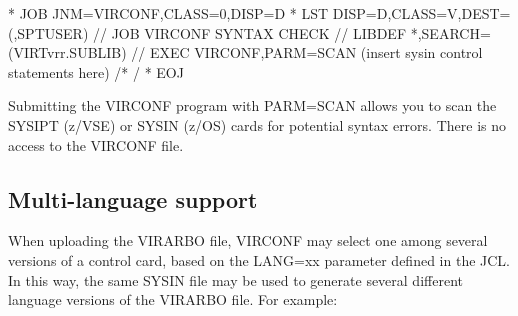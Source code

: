 \documentclass[letterpaper,10pt,english]{sphinxmanual}
\begin{document}
\begin{sphinxVerbatim}[commandchars=\\\{\}]
* \PYGZdl{}\PYGZdl{} JOB JNM=VIRCONF,CLASS=0,DISP=D
* \PYGZdl{}\PYGZdl{} LST DISP=D,CLASS=V,DEST=(,SPTUSER)
// JOB VIRCONF SYNTAX CHECK
// LIBDEF *,SEARCH=(VIRTvrr.SUBLIB)
// EXEC VIRCONF,PARM=\PYGZsq{}SCAN\PYGZsq{}
        (insert sysin control statements here)
/*
/\PYGZam{}
* \PYGZdl{}\PYGZdl{} EOJ
\end{sphinxVerbatim}


\begin{sphinxVerbatim}[commandchars=\\\{\}]
  
   
  
  
  
  
            
\end{sphinxVerbatim}


Submitting the VIRCONF program with PARM=SCAN allows you to scan the SYSIPT (z/VSE) or SYSIN (z/OS) cards for potential syntax errors. There is no access to the VIRCONF file.


\subsection{Multi-language support}
\label{\detokenize{Installation_Guide:multi-language-support}}\label{\detokenize{Installation_Guide:index-157}}
When uploading the VIRARBO file, VIRCONF may select one among several versions of a control card, based on the LANG=xx parameter defined in the JCL. In this way, the same SYSIN file may be used to generate several different language versions of the VIRARBO file. For example:
\end{document}
